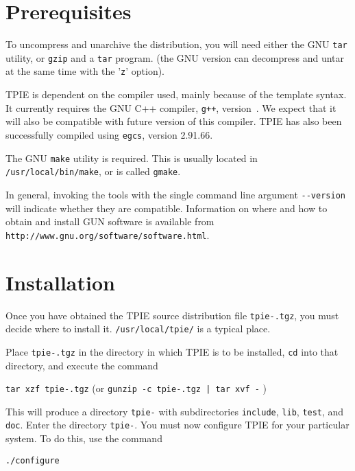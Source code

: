 \section{Prerequisites}
\label{sec:gnu-software}

To uncompress and unarchive the distribution, you will need either the GNU
\verb|tar| utility, or \verb|gzip| and a \verb|tar| program. (the GNU
version can decompress and untar at the same time with the '\verb|z|' option).

TPIE is dependent on the compiler used, mainly because of the template
syntax. It currently requires the GNU C++ compiler, \verb|g++|,
version~\gxxversion. We
expect that it will also be compatible with future version of this
compiler.  TPIE has also been successfully compiled using
\verb|egcs|, version 2.91.66.

The GNU \verb|make| utility is required. This is usually located in
\verb|/usr/local/bin/make|, or is called \verb|gmake|.

In general, invoking the tools with the single command line argument 
\verb|--version| will indicate whether they are compatible.
Information on where and how to obtain and install GUN software is
available from 
{\tt http://www.gnu.org/software/software.html}.

\section{Installation}

Once you have obtained the TPIE source distribution file
{\tt tpie-\version.tgz}, you must decide where to install it.
\verb|/usr/local/tpie/| is a typical place.

Place {\tt tpie-\version.tgz} in the directory in which TPIE is to
be installed, \verb|cd| into that directory, and execute the command

\begin{flushleft}
{\tt tar xzf tpie-\version.tgz}
(or {\tt gunzip -c tpie-\version.tgz | tar xvf -} )  
\end{flushleft}


This will produce a directory {\tt tpie-\version} with subdirectories
\verb|include|, \verb|lib|, \verb|test|, and \verb|doc|.  Enter the
directory {\tt tpie-\version}.  You must now configure TPIE for your
particular system.  To do this, use the command

\begin{verbatim}
./configure
\end{verbatim}

